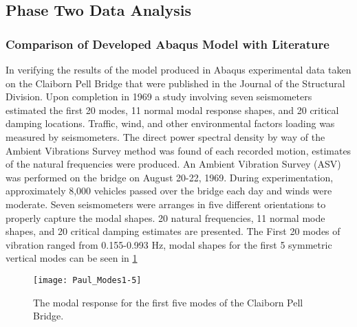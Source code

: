 \subsection{Phase Two Data Analysis}

\subsubsection{Comparison of Developed Abaqus Model with Literature}


In verifying the results of the model produced in Abaqus experimental data taken on the Claiborn Pell Bridge that were published in the Journal of the
Structural Division. Upon completion in 1969 a study involving seven seismometers estimated the first 20 modes, 11 normal modal response shapes, and 20
critical damping locations. Traffic, wind, and other environmental factors loading was measured by seismometers. The direct power spectral density by
way of the Ambient Vibrations Survey method was found of each recorded motion, estimates of the natural frequencies were produced. An Ambient Vibration
Survey (ASV) was performed on the bridge on August 20-22, 1969. During experimentation, approximately 8,000 vehicles passed over the bridge each day
and winds were moderate. Seven seismometers were arranges in five different orientations to properly capture the modal shapes. 20 natural
frequencies, 11 normal mode shapes, and 20 critical damping estimates are presented. The First 20 modes of vibration ranged from 0.155-0.993 Hz,
modal shapes for the first 5 symmetric vertical modes can be seen in \ref{fig:Paul_Modes1-5}\\

\begin{figure}

\centering

\texttt{[image: Paul\_Modes1-5]}

\caption{The modal response for the first five modes of the Claiborn Pell Bridge.}

\label{fig:Paul_Modes1-5}

\end{figure}

